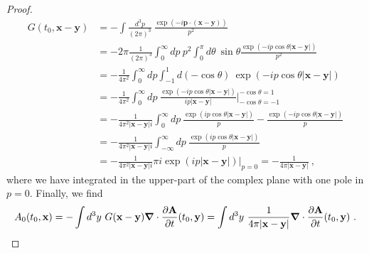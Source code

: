 \begin{proof}
\begin{equation*}
        \begin{aligned}
            G (t_0, \mathbf x - \mathbf y) & = - \int \frac{d^3 p}{(2\pi)^3} ~ \frac{\exp(- i \mathbf p \cdot (\mathbf x - \mathbf y))}{p^2} \\ & = - 2 \pi \frac{1}{(2\pi)^3} \int_0^\infty dp ~ p^2 \int_0^\pi d\theta ~ \sin \theta \frac{\exp(- i p \cos\theta |\mathbf x - \mathbf y|)}{p^2} \\ & = - \frac{1}{4 \pi^2} \int_0^\infty dp \int_{-1}^{1} d (- \cos \theta) ~ \exp(- i p \cos \theta |\mathbf x - \mathbf y|) \\ & = - \frac{1}{4 \pi^2} \int_0^\infty dp ~ \frac{\exp(-i p \cos \theta |\mathbf x - \mathbf y|)}{i p |\mathbf x - \mathbf y|} \Big \vert_{-\cos \theta = -1}^{-\cos \theta = 1} \\ & = - \frac{1}{4 \pi^2 |\mathbf x - \mathbf y| i} \int_0^\infty dp ~ \frac{\exp(i p \cos \theta |\mathbf x - \mathbf y|)}{p} - \frac{\exp(-i p \cos \theta |\mathbf x - \mathbf y|)}{p} \\ & = - \frac{1}{4 \pi^2 |\mathbf x - \mathbf y| i} \int_{-\infty}^\infty dp ~ \frac{\exp(i p \cos \theta |\mathbf x - \mathbf y|)}{p}  \\ & = - \frac{1}{4 \pi^2 |\mathbf x - \mathbf y| i} \pi i \exp (i p |\mathbf x - \mathbf y|) \Big \vert_{p = 0} = - \frac{1}{4 \pi |\mathbf x - \mathbf y|} ~,
        \end{aligned}
        \end{equation*}
        where we have integrated in the upper-part of the complex plane with one pole in $p=0$. Finally, we find 
        \begin{equation*}
            A_0 (t_0, \mathbf x) = - \int d^3 y ~ G(\mathbf x - \mathbf y) \boldsymbol \nabla \cdot \frac{\partial\mathbf A}{\partial t} (t_0, \mathbf y) = \int d^3 y ~ \frac{1}{4\pi |\mathbf x - \mathbf y|} \boldsymbol \nabla \cdot \frac{\partial\mathbf A}{\partial t} (t_0, \mathbf y)~.
        \end{equation*}
    \end{proof}

